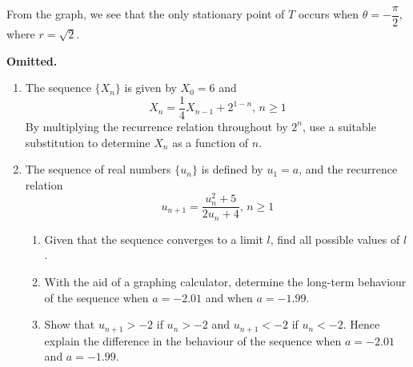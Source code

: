 \documentclass{jhwhw}
\begin{document}
            \noindent From the graph, we see that the only stationary point of $T$ occurs when $\theta = -\dfrac\pi2$, where $r = \sqrt2$.

    \problem{}
        \textbf{Omitted.}

    \problem{}
        \begin{enumerate}
            \item The sequence $\{X_n\}$ is given by $X_0 = 6$ and
            \begin{equation*}
                X_n = \dfrac14 X_{n-1} + 2^{1-n}, \, n \geq 1
            \end{equation*}
            By multiplying the recurrence relation throughout by $2^n$, use a suitable substitution to determine $X_n$ as a function of $n$.
            \item The sequence of real numbers $\{u_n\}$ is defined by $u_1 = a$, and the recurrence relation
            \begin{equation*}
                u_{n+1} = \dfrac{u_n^2 + 5}{2u_n + 4}, \, n \geq 1
            \end{equation*}
            \begin{enumerate}
                \item Given that the sequence converges to a limit $l$, find all possible values of $l$.
                \item With the aid of a graphing calculator, determine the long-term behaviour of the sequence when $a = -2.01$ and when $a = -1.99$.
                \item Show that $u_{n+1} > -2$ if $u_n > -2$ and $u_{n+1} < -2$ if $u_n < -2$. Hence explain the difference in the behaviour of the sequence when $a = -2.01$ and $a = -1.99$.
            \end{enumerate}
        \end{enumerate}

    \solution
\end{document}
